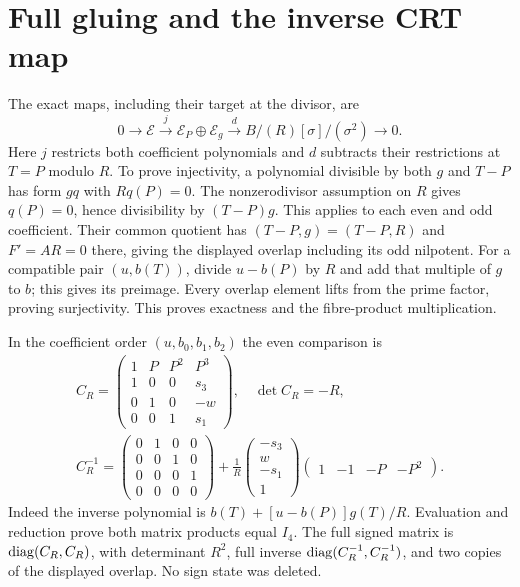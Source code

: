 \documentclass[11pt]{article}
\begin{document}
\section{Full gluing and the inverse CRT map}
The exact maps, including their target at the divisor, are
\begin{equation}
 0\longrightarrow\mathscr E\xrightarrow{j}\mathscr E_P\oplus\mathscr E_g
 \xrightarrow{d} B/(R)[\sigma]/(\sigma^2)\longrightarrow0.
 \tag{ECC3}
\end{equation}
Here $j$ restricts both coefficient polynomials and $d$ subtracts their
restrictions at $T=P$ modulo $R$. To prove injectivity, a polynomial
divisible by both $g$ and $T-P$ has form $gq$ with $R q(P)=0$.
The nonzerodivisor assumption on $R$ gives $q(P)=0$, hence divisibility by
$(T-P)g$. This applies to each even and odd coefficient. Their common
quotient has $(T-P,g)=(T-P,R)$ and $F'=AR=0$ there, giving the displayed
overlap including its odd nilpotent. For a compatible pair $(u,b(T))$,
divide $u-b(P)$ by $R$ and add that multiple of $g$ to $b$; this gives its
preimage. Every overlap element lifts from the prime factor, proving
surjectivity. This proves exactness and the fibre-product multiplication.

In the coefficient order $(u,b_0,b_1,b_2)$ the even comparison is
\begin{equation}
 \begin{gathered}
 C_R=\begin{pmatrix}1&P&P^2&P^3\\1&0&0&s_3\\
 0&1&0&-w\\0&0&1&s_1\end{pmatrix},\quad
 \det C_R=-R,\\
 C_R^{-1}=\begin{pmatrix}0&1&0&0\\0&0&1&0\\0&0&0&1\\0&0&0&0\end{pmatrix}
 +\frac1R\begin{pmatrix}-s_3\\w\\-s_1\\1\end{pmatrix}
             \begin{pmatrix}1&-1&-P&-P^2\end{pmatrix}.
 \end{gathered}
 \tag{ECC4}
\end{equation}
Indeed the inverse polynomial is
$b(T)+[u-b(P)]g(T)/R$. Evaluation and reduction prove both matrix products
equal $I_4$. The full signed matrix is $\operatorname{diag}(C_R,C_R)$, with determinant
$R^2$, full inverse $\operatorname{diag}(C_R^{-1},C_R^{-1})$, and two copies of the
displayed overlap. No sign state was deleted.
\end{document}
